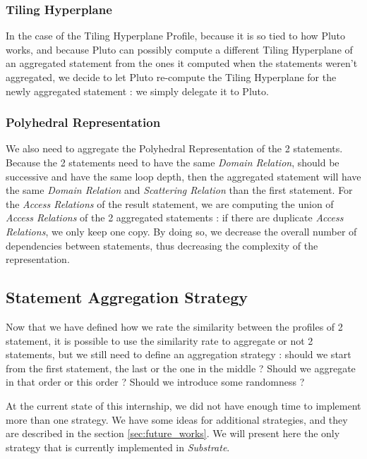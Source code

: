 \documentclass[paper=a4, fontsize=11.5pt]{scrartcl}
\numberwithin{equation}{section}        %
\numberwithin{figure}{section}          %
\numberwithin{table}{section}               %
\begin{document}
        \subsubsection{Tiling Hyperplane}
            In the case of the Tiling Hyperplane Profile, because it is so tied to how
            Pluto works, and because Pluto can possibly compute a different Tiling Hyperplane
            of an aggregated statement from the ones it computed when the statements weren't
            aggregated, we decide to let Pluto re-compute the Tiling Hyperplane for the newly
            aggregated statement : we simply delegate it to Pluto.
        \subsubsection{Polyhedral Representation}
            We also need to aggregate the Polyhedral Representation of the 2 statements.
            Because the 2 statements need to have the same \textit{Domain Relation}, should be
            successive and have the same loop depth, then the aggregated statement will have
            the same \textit{Domain Relation} and \textit{Scattering Relation} than the first
            statement. For the \textit{Access Relations} of the result statement, we
            are computing the union of \textit{Access Relations} of the 2 aggregated statements :
            if there are duplicate \textit{Access Relations}, we only keep one copy.
            By doing so, we decrease the overall number of dependencies between statements,
            thus decreasing the complexity of the representation.
            

    \subsection{Statement Aggregation Strategy}
        Now that we have defined how we rate the similarity between the profiles of 2 statement,
        it is possible to use the similarity rate to aggregate or not 2 statements, but
        we still need to define an aggregation strategy : should we start from the first
        statement, the last or the one in the middle ? Should we aggregate in that order
        or this order ? Should we introduce some randomness ?

        At the current state of this internship, we did not have enough time to implement
        more than one strategy. We have some ideas for additional strategies, and
        they are described in the section \ref{sec:future_works}. We will present
        here the only strategy that is currently implemented
        in \textit{Substrate}.
\end{document}
